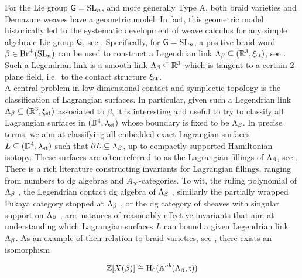 \vspace{0.5cm}
\normalsize
 For the Lie group $\mathsf{G}=\operatorname{SL}_n$, and more generally Type A, both braid varieties and Demazure weaves have a geometric model. In fact, this geometric model historically led to the systematic development of weave calculus for any simple algebraic Lie group $\mathsf{G}$, see \cite{CasalsZaslow,CasalsWeng22}. Specifically, for $\mathsf{G}=\operatorname{SL}_n$, a positive braid word $\beta\in\text{Br}^+(\operatorname{SL}_n)$ can be used to construct a Legendrian link $\Lambda_\beta\subseteq(\mathbb{R}^3,\xi_{\text{st}})$, see . Such a Legendrian link is a smooth link $\Lambda_\beta\subseteq\mathbb{R}^3$ which is tangent to a certain 2-plane field, i.e.~to the contact structure $\xi_{\text{st}}$.\\

A central problem in low-dimensional contact and symplectic topology is the classification of Lagrangian surfaces. In particular, given such a Legendrian link $\Lambda_\beta\subseteq(\mathbb{R}^3,\xi_{\text{st}})$ associated to $\beta$, it is interesting and useful to try to classify all Lagrangian surfaces in $(\mathbb{D}^4,\lambda_{\text{st}})$ whose boundary is fixed to be $\Lambda_\beta$. In precise terms, we aim at classifying all embedded exact Lagrangian surfaces $L\subseteq(\mathbb{D}^4,\lambda_{\text{st}})$ such that $\partial L\subseteq\Lambda_\beta$, up to compactly supported Hamiltonian isotopy. These surfaces are often referred to as the Lagrangian fillings of $\Lambda_\beta$, see . There is a rich literature constructing invariants for Lagrangian fillings, ranging from numbers to dg algebras and $A_\infty$-categories. To wit, the ruling polynomial of $\Lambda_\beta$ \cite{Rutherford11_HOMFLY,Rutherford06_HOMFLY}, the Legendrian contact dg algebra of $\Lambda_\beta$ \cite{Chekanov,EtnyreNg22_Survey}, similarly the partially wrapped Fukaya category stopped at $\Lambda_\beta$ \cite{GPSCV,GPS18,Syl19}, or the dg category of sheaves with singular support on $\Lambda_\beta$ \cite{KashiwaraSchapira_Book,GKS_Quantization,MR4612528,STZ2017}, are instances of reasonably effective invariants that aim at understanding which Lagrangian surfaces $L$ can bound a given Legendrian link $\Lambda_\beta$. As an example of their relation to braid varieties, see , there exists an isomorphism 

\begin{equation}\label{eq:intro_braid_variety_DGA}
    \mathbb{Z}[X(\beta)]\cong\operatorname{H}_0(\mathbb{A}^{ab}(\Lambda_\beta,\mathfrak{t}))
\end{equation}

